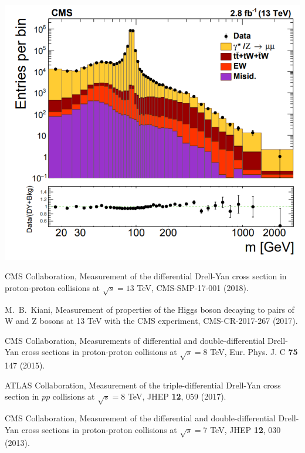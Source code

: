 \documentclass[a4paper,10pt,english]{article}
\begin{document}
\begin{minipage}{0.49\textwidth}
	\begin{center}
		\includegraphics[width=.99\linewidth]{Figure2.png}
	\end{center}
\end{minipage}
\vspace{-0.2cm}

\vspace{0.3cm}
\begin{thebibliography}{References}

CMS Collaboration, Measurement of the differential Drell-Yan cross section in proton-proton collisions at $\sqrt{s}=13$ TeV, CMS-SMP-17-001 (2018).

M.\ B.\ Kiani, Measurement of properties of the Higgs boson decaying to pairs of W and Z bosons at 13 TeV with the
CMS experiment, CMS-CR-2017-267 (2017).

CMS Collaboration, Measurements of differential and double-differential Drell-Yan cross sections in proton-proton
collisions at $\sqrt{s}=8$ TeV, Eur. Phys. J. C \textbf{75} 147 (2015).

ATLAS Collaboration, Measurement of the triple-differential Drell-Yan cross section in $pp$ collisions at $\sqrt{s}=8$ TeV,
JHEP \textbf{12}, 059 (2017).

CMS Collaboration, Measurement of the differential and double-differential Drell-Yan cross sections in proton-proton collisions
at $\sqrt{s}=7$ TeV, JHEP \textbf{12}, 030 (2013).

\end{thebibliography}
\end{document}
